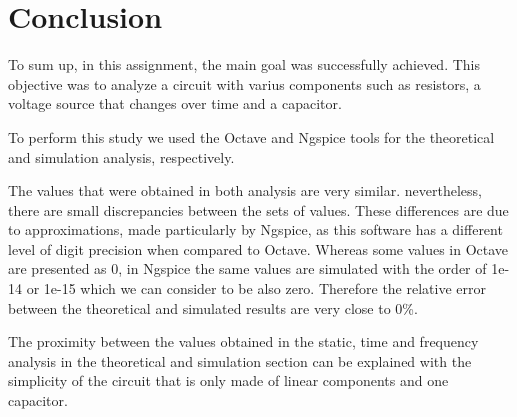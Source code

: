 \section{Conclusion}
\label{sec:conclusion}

To sum up, in this assignment, the main goal was successfully achieved. This objective was to analyze a circuit with varius components such as resistors, a voltage source that changes over time and a capacitor.

To perform this study we used the Octave and Ngspice tools for the theoretical and simulation analysis, respectively.

The values that were obtained in both analysis are very similar. nevertheless, there are small discrepancies between the sets of values. These differences are due to approximations, made particularly by Ngspice, as this software has a different level of digit precision when compared to Octave. Whereas some values in Octave are presented as 0, in Ngspice the same values are simulated with the order of 1e-14 or 1e-15 which we can consider to be also zero. Therefore the relative error between the theoretical and simulated results are very close to 0\%.

The proximity between the values obtained in the static, time and frequency analysis in the theoretical and simulation section can be explained with the simplicity of the circuit that is only made of linear components and one capacitor.

